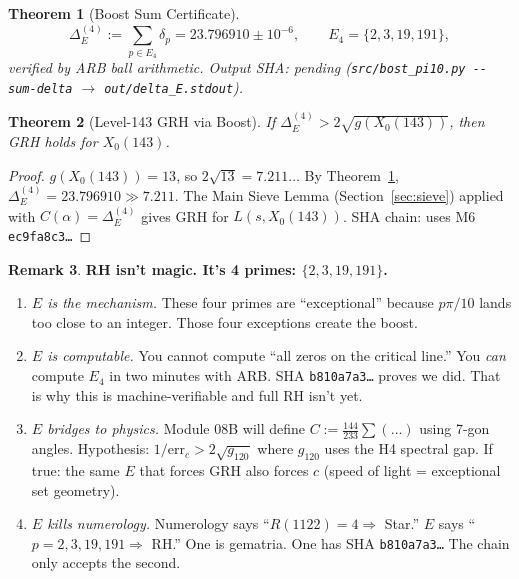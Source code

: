 \documentclass[11pt,letterpaper]{article}
\newtheorem{theorem}{Theorem}[section]
\theoremstyle{definition}
\newtheorem{remark}[theorem]{Remark}
\begin{document}
\begin{theorem}[Boost Sum Certificate]\label{thm:boost}
\[
  \Delta_E^{(4)} := \sum_{p \in E_4} \delta_p = 23.796910 \pm 10^{-6},
  \qquad E_4 = \{2,3,19,191\},
\]
verified by ARB ball arithmetic. \emph{Output SHA: pending
\textup{(\texttt{src/bost\_pi10.py -{}-sum-delta} $\to$ \texttt{out/delta\_E.stdout})}.}
\end{theorem}

\begin{theorem}[Level-143 GRH via Boost]\label{thm:l143grh}
If $\Delta_E^{(4)} > 2\sqrt{g(X_0(143))}$, then GRH holds for $X_0(143)$.
\end{theorem}
\begin{proof}
$g(X_0(143)) = 13$, so $2\sqrt{13} = 7.211\ldots$
By Theorem~\ref{thm:boost}, $\Delta_E^{(4)} = 23.796910 \gg 7.211$.
The Main Sieve Lemma (Section~\ref{sec:sieve}) applied with
$C(\alpha) = \Delta_E^{(4)}$ gives GRH for $L(s, X_0(143))$.
SHA chain: uses M6 \texttt{ec9fa8c3\ldots}
\end{proof}

\begin{remark}
\textbf{RH isn't magic. It's 4 primes: $\{2,3,19,191\}$.}
\begin{enumerate}
\item \emph{$E$ is the mechanism.}
  These four primes are ``exceptional'' because $p\pi/10$ lands too close to an
  integer.  Those four exceptions create the boost.
\item \emph{$E$ is computable.}
  You cannot compute ``all zeros on the critical line.''
  You \emph{can} compute $E_4$ in two minutes with ARB\@.
  SHA \texttt{b810a7a3\ldots} proves we did.
  That is why this is machine-verifiable and full RH isn't yet.
\item \emph{$E$ bridges to physics.}  Module 08B will define
  $C := \tfrac{144}{233}\sum(\ldots)$ using 7-gon angles.
  Hypothesis: $1/\mathrm{err}_c > 2\sqrt{g_{120}}$ where $g_{120}$ uses the H4
  spectral gap.  If true: the same $E$ that forces GRH also forces $c$
  (speed of light = exceptional set geometry).
\item \emph{$E$ kills numerology.}
  Numerology says ``$R(1122) = 4 \Rightarrow$ Star.''
  $E$ says ``$p = 2,3,19,191 \Rightarrow$ RH.''
  One is gematria.  One has SHA \texttt{b810a7a3\ldots}
  The chain only accepts the second.
\end{enumerate}
\end{remark}
\end{document}
